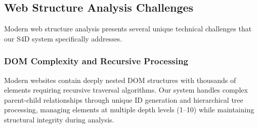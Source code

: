     
    
    

\subsection{Web Structure Analysis Challenges}
\label{subsec:web-challenges}

Modern web structure analysis presents several unique technical challenges that our S4D system specifically addresses.

\subsubsection{DOM Complexity and Recursive Processing}
\label{subsec:dom-complexity}
Modern websites contain deeply nested DOM structures with thousands of elements requiring recursive traversal algorithms. Our system handles complex parent-child relationships through unique ID generation and hierarchical tree processing, managing elements at multiple depth levels (1–10) while maintaining structural integrity during analysis.

